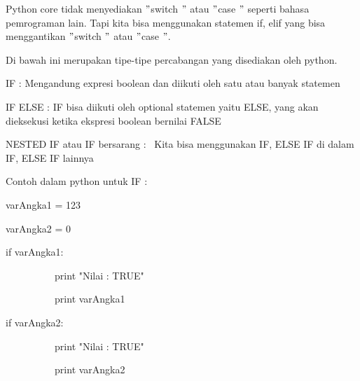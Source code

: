 \noindent 
Python core tidak menyediakan  $ " $switch $ " $ atau  $ " $case $ " $ seperti bahasa pemrograman lain. Tapi kita bisa menggunakan statemen if, elif yang bisa menggantikan  $ " $switch $ " $ atau  $ " $case $ " $. \par
\vspace{12pt}
\noindent 
Di bawah ini merupakan tipe-tipe percabangan yang disediakan oleh python. \par
\vspace{12pt}
\noindent 
IF : Mengandung expresi boolean dan diikuti oleh satu atau banyak statemen \par
\vspace{12pt}
\noindent 
IF ELSE : IF bisa diikuti oleh optional statemen yaitu ELSE, yang akan dieksekusi ketika ekspresi boolean bernilai FALSE \par
\vspace{12pt}
\noindent 
NESTED IF atau IF bersarang :~ Kita bisa menggunakan IF, ELSE IF di dalam IF, ELSE IF lainnya \par
\vspace{12pt}
\noindent 
Contoh dalam python untuk IF :  \par
\vspace{12pt}
\noindent 
varAngka1 = 123 \par
\vspace{12pt}
\noindent 
varAngka2 = 0 \par
\vspace{12pt}
\noindent 
if varAngka1: \par
\vspace{12pt}
\noindent 
 $  $ $  $ $  $ $  $ $  $ $  $ $  $ $  $ $  $ $  $ $  $ $  $ $  $ $  $ $  $ $  $print "Nilai : TRUE" \par
\vspace{12pt}
\noindent 
 $  $ $  $ $  $ $  $ $  $ $  $ $  $ $  $ $  $ $  $ $  $ $  $ $  $ $  $ $  $ $  $print varAngka1 \par
\vspace{12pt}
\noindent 
if varAngka2: \par
\vspace{12pt}
\noindent 
 $  $ $  $ $  $ $  $ $  $ $  $ $  $ $  $ $  $ $  $ $  $ $  $ $  $ $  $ $  $ $  $print "Nilai : TRUE" \par
\vspace{12pt}
\noindent 
 $  $ $  $ $  $ $  $ $  $ $  $ $  $ $  $ $  $ $  $ $  $ $  $ $  $ $  $ $  $ $  $print varAngka2{\fontsize{14pt}{14pt}\selectfont  $  $ \\} \par
